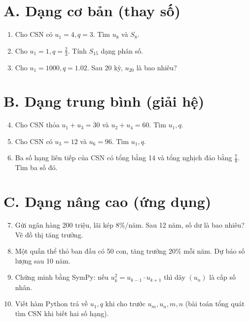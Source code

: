 \documentclass[12pt,a4paper]{report}
\begin{document}
\section*{A. Dạng cơ bản (thay số)}

\begin{enumerate}
  \item Cho CSN có $u_1 = 4, q = 3$. Tìm $u_8$ và $S_8$.
  \item Cho $u_1 = 1, q = \tfrac{2}{3}$. Tính $S_{15}$ dạng phân số.
  \item Cho $u_1 = 1000, q = 1.02$. Sau 20 kỳ, $u_{20}$ là bao nhiêu?
\end{enumerate}

\section*{B. Dạng trung bình (giải hệ)}

\begin{enumerate}
  \setcounter{enumi}{3}
  \item Cho CSN thỏa $u_1 + u_3 = 30$ và $u_2 + u_4 = 60$. Tìm $u_1, q$.
  \item Cho CSN có $u_3 = 12$ và $u_6 = 96$. Tìm $u_1, q$.
  \item Ba số hạng liên tiếp của CSN có tổng bằng 14 và tổng nghịch đảo
  bằng $\tfrac{7}{8}$. Tìm ba số đó.
\end{enumerate}

\section*{C. Dạng nâng cao (ứng dụng)}

\begin{enumerate}
  \setcounter{enumi}{6}
  \item Gửi ngân hàng 200 triệu, lãi kép 8\%/năm. Sau 12 năm, số dư là
  bao nhiêu? Vẽ đồ thị tăng trưởng.
  \item Một quần thể thỏ ban đầu có 50 con, tăng trưởng 20\% mỗi năm.
  Dự báo số lượng sau 10 năm.
  \item Chứng minh bằng SymPy: nếu $u_k^2 = u_{k-1} \cdot u_{k+1}$ thì
  dãy $(u_n)$ là cấp số nhân.
  \item Viết hàm Python trả về $u_1, q$ khi cho trước $u_m, u_n, m, n$
  (bài toán tổng quát tìm CSN khi biết hai số hạng).
\end{enumerate}
\end{document}
